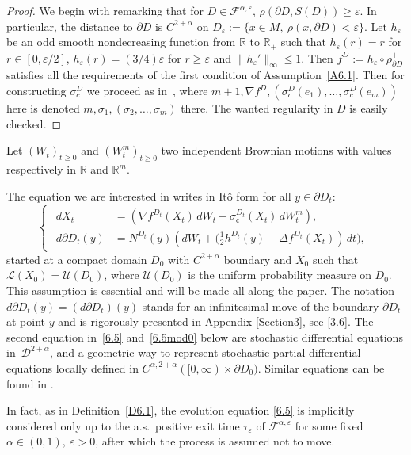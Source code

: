 \documentclass[10pt]{amsart}
\theoremstyle{plain}
\theoremstyle{definition}
\newcommand{\RR}{{\mathbb R}}
\newcommand{\SD}{{\mathscr D}}
\newcommand{\SL}{{\mathscr L}}
\newcommand{\SU}{{\mathscr U}}
\let\a\alpha
\let\e\varepsilon
\let\n\nabla
\let\s\sigma
\let\pa\partial
\newcommand{\cF}{\mathcal{F}}
\begin{document}
\begin{proof}
We begin with remarking that for $D\in \cF^{\alpha,\e}$, $\rho(\partial D, S(D))\ge \e$. In particular, the distance to $\partial D$ is $C^{2+\a}$ on $D_\e:=\{x\in M,\ \rho(x,\partial D)< \e\}$. Let $h_\e$ be an odd smooth nondecreasing function from $\RR$ to $\RR_+$ such that $h_\e(r)=r$ for $r\in [0,\e/2]$, $h_\e(r)=(3/4)\e$ for $r\ge \e$ and $\|h_\e'\|_\infty\le 1$. Then $f^D:=h_\e\circ {\rho^{+}_{\partial D}}$ satisfies all the requirements of the first condition of Assumption~\ref{A6.1}. Then for constructing $\s_c^D$ we proceed as in~\cite[Prop.\,3.2]{Arnaudon-Li:17}, where $m+1,\n f^D,(\s_c^D(e_1),\ldots, \s_c^D(e_m))$ here is denoted $m,\s_1,(\s_2,\ldots, \s_m)$ there. The wanted regularity in $D$ is easily checked.
\end{proof}

Let $(W_t)_{t\geq 0}$ and $(W_t^m)_{t\geq 0}$ two independent Brownian motions with values respectively in $\RR$ and $\RR^m$.

The equation we are interested in writes in Itô form for all $y\in \partial D_t$:
\begin{equation}
\label{6.5}
\begin{cases}
\begin{aligned}
dX_t&=\left(\n f^{D_t}(X_t) \, dW_t+ \sigma_{\mathrm c}^{D_t}(X_t)\, dW_t^m\right),\\
d\partial D_t(y)&=N^{D_t}(y)\left(dW_t
+\bigl(\tfrac12 h^{D_t}(y)+\Delta f^{D_t}(X_t)\right)\,dt\bigr),
\end{aligned}
\end{cases}
\end{equation}
started at
a compact domain $D_0$ with $C^{2+\a}$ boundary and $X_0$ such that $\SL(X_0)=\SU(D_0)$, where $\SU(D_0)$ is the uniform probability measure on $D_0$. This assumption is essential and will be made all along the paper.
The notation $d\partial D_t(y)=(d\partial D_t)(y)$ stands for an infinitesimal move of the boundary $\pa D_t$ at point $y$ and is rigorously presented in Appendix \ref{Section3}, see \eqref{3.6}. The second equation in~\eqref{6.5} and~\eqref{6.5mod0} below are stochastic differential equations in~$\SD^{2+\a}$, and a geometric way to represent stochastic partial differential equations locally defined in $C^{\alpha,2+\alpha}([0,\infty)\times\partial D_0)$. Similar equations can be found in \cite[App.\,A.2]{GGLS:22}.

In fact, as in Definition~\ref{D6.1}, the evolution equation \eqref{6.5} is implicitly considered only up to the a.s.\ positive exit time $\tau_\e$ of $\cF^{\a,\e}$ for some fixed $\a\in(0,1),\ \e>0$, after which the process
is assumed not to move.
\end{document}
